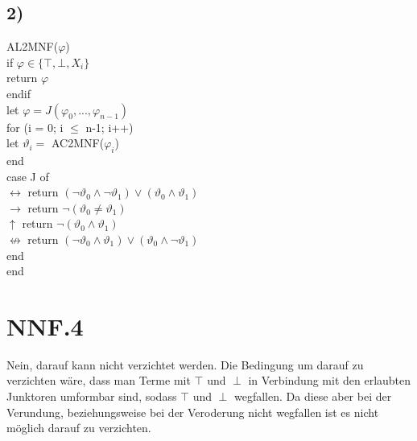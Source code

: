 \documentclass[12pt, a4paper]{article}
\begin{document}
\subsection*{2)}
AL2MNF($\varphi$)\\
\noindent\hspace*{5mm} if $\varphi \in \{ \top, \bot , X_i \}$\\  
\noindent\hspace*{10mm} return $\varphi$\\    
\noindent\hspace*{5mm} endif\\
\noindent\hspace*{5mm} let $\varphi = J(\varphi_0,...,\varphi_{n-1})$\\
\noindent\hspace*{5mm} for (i = 0; i $\le$ n-1; i++)\\
\noindent\hspace*{10mm} let $\vartheta_i =$ AC2MNF($\varphi_i$)\\
\noindent\hspace*{5mm} end\\
\noindent\hspace*{5mm} case J of\\
\noindent\hspace*{10mm} $\leftrightarrow$ return $(\neg \vartheta_0 \wedge \neg \vartheta_1) \vee (\vartheta_0 \wedge \vartheta_1)$\\
\noindent\hspace*{10mm} $\rightarrow$ return $\neg( \vartheta_0 \neq \vartheta_1)$\\
\noindent\hspace*{10mm} $\uparrow$ return $\neg (\vartheta_0 \wedge \vartheta_1)$\\
\noindent\hspace*{10mm} $\nleftrightarrow$ return $(\neg \vartheta_0 \wedge \vartheta_1) \vee (\vartheta_0 \wedge \neg \vartheta_1)$\\
\noindent\hspace*{5mm} end\\
end

\section*{NNF.4}
Nein, darauf kann nicht verzichtet werden. Die Bedingung um darauf zu verzichten wäre, dass man Terme mit $\top$ und $\perp$ in Verbindung mit den erlaubten Junktoren umformbar sind, sodass $\top$ und $\perp$ wegfallen. Da diese aber bei der Verundung, beziehungsweise bei der Veroderung nicht wegfallen ist es nicht möglich darauf zu verzichten.
\end{document}
